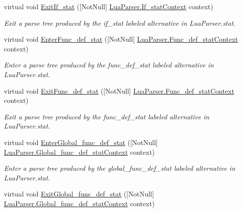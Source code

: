 \begin{DoxyCompactItemize}
virtual void \mbox{\hyperlink{classzlua_1_1_lua_base_listener_aadcd2b60bcec7dda7b397a674e1d6082}{Exit\+If\+\_\+stat}} (\mbox{[}Not\+Null\mbox{]} \mbox{\hyperlink{classzlua_1_1_lua_parser_1_1_if__stat_context}{Lua\+Parser.\+If\+\_\+stat\+Context}} context)
\begin{DoxyCompactList}\small\item\em Exit a parse tree produced by the {\ttfamily if\+\_\+stat} labeled alternative in Lua\+Parser.\+stat. \end{DoxyCompactList}\item 
virtual void \mbox{\hyperlink{classzlua_1_1_lua_base_listener_ae342d4559800c58b6cfc9e42d5ba2837}{Enter\+Func\+\_\+def\+\_\+stat}} (\mbox{[}Not\+Null\mbox{]} \mbox{\hyperlink{classzlua_1_1_lua_parser_1_1_func__def__stat_context}{Lua\+Parser.\+Func\+\_\+def\+\_\+stat\+Context}} context)
\begin{DoxyCompactList}\small\item\em Enter a parse tree produced by the {\ttfamily func\+\_\+def\+\_\+stat} labeled alternative in Lua\+Parser.\+stat. \end{DoxyCompactList}\item 
virtual void \mbox{\hyperlink{classzlua_1_1_lua_base_listener_a49406b24e09c5b7866b11d4554ca1531}{Exit\+Func\+\_\+def\+\_\+stat}} (\mbox{[}Not\+Null\mbox{]} \mbox{\hyperlink{classzlua_1_1_lua_parser_1_1_func__def__stat_context}{Lua\+Parser.\+Func\+\_\+def\+\_\+stat\+Context}} context)
\begin{DoxyCompactList}\small\item\em Exit a parse tree produced by the {\ttfamily func\+\_\+def\+\_\+stat} labeled alternative in Lua\+Parser.\+stat. \end{DoxyCompactList}\item 
virtual void \mbox{\hyperlink{classzlua_1_1_lua_base_listener_a26ccde71c2f917da169f16fa1dea9ecc}{Enter\+Global\+\_\+func\+\_\+def\+\_\+stat}} (\mbox{[}Not\+Null\mbox{]} \mbox{\hyperlink{classzlua_1_1_lua_parser_1_1_global__func__def__stat_context}{Lua\+Parser.\+Global\+\_\+func\+\_\+def\+\_\+stat\+Context}} context)
\begin{DoxyCompactList}\small\item\em Enter a parse tree produced by the {\ttfamily global\+\_\+func\+\_\+def\+\_\+stat} labeled alternative in Lua\+Parser.\+stat. \end{DoxyCompactList}\item 
virtual void \mbox{\hyperlink{classzlua_1_1_lua_base_listener_afc42dc32e923011884d110d92eb7024b}{Exit\+Global\+\_\+func\+\_\+def\+\_\+stat}} (\mbox{[}Not\+Null\mbox{]} \mbox{\hyperlink{classzlua_1_1_lua_parser_1_1_global__func__def__stat_context}{Lua\+Parser.\+Global\+\_\+func\+\_\+def\+\_\+stat\+Context}} context)

\end{DoxyCompactItemize}
